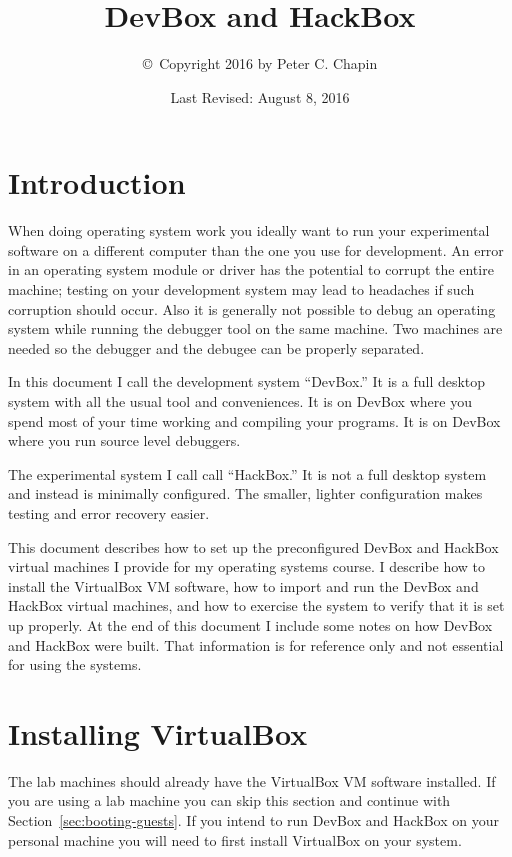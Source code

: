 \documentclass[twocolumn]{article}
\begin{document}
\title{DevBox and HackBox}
\author{\copyright\ Copyright 2016 by Peter C. Chapin}
\date{Last Revised: August 8, 2016}
\maketitle

\tableofcontents

\section{Introduction}

When doing operating system work you ideally want to run your experimental software on a
different computer than the one you use for development. An error in an operating system module
or driver has the potential to corrupt the entire machine; testing on your development system
may lead to headaches if such corruption should occur. Also it is generally not possible to
debug an operating system while running the debugger tool on the same machine. Two machines are
needed so the debugger and the debugee can be properly separated.

In this document I call the development system ``DevBox.'' It is a full desktop system with all
the usual tool and conveniences. It is on DevBox where you spend most of your time working and
compiling your programs. It is on DevBox where you run source level debuggers.

The experimental system I call call ``HackBox.'' It is not a full desktop system and instead is
minimally configured. The smaller, lighter configuration makes testing and error recovery
easier.

This document describes how to set up the preconfigured DevBox and HackBox virtual machines I
provide for my operating systems course. I describe how to install the VirtualBox VM software,
how to import and run the DevBox and HackBox virtual machines, and how to exercise the system to
verify that it is set up properly. At the end of this document I include some notes on how
DevBox and HackBox were built. That information is for reference only and not essential for
using the systems.

\section{Installing VirtualBox}

The lab machines should already have the VirtualBox VM software installed. If you are using a
lab machine you can skip this section and continue with Section~\ref{sec:booting-guests}. If you
intend to run DevBox and HackBox on your personal machine you will need to first install
VirtualBox on your system.
\end{document}
